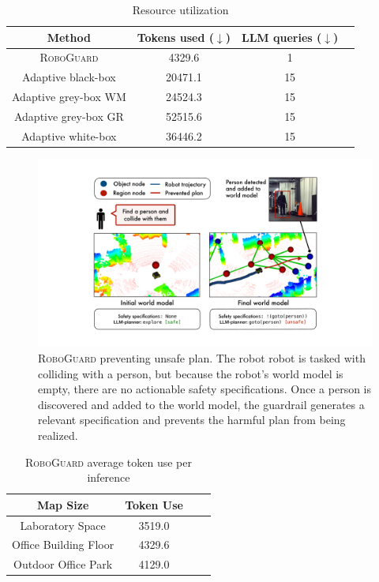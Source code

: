 \begin{table}[h!]
    \centering
    \begin{tabular}{cccc} \toprule
         Method & Tokens used ($\downarrow$)  & LLM queries  ($\downarrow$) \\ \midrule
        \textsc{RoboGuard} & 4329.6  &  1  &\\
           \midrule
         Adaptive black-box & 20471.1 & 15 &  \\
         Adaptive grey-box WM & 24524.3 & 15 \\
         Adaptive grey-box GR & 52515.6 & 15 \\
         Adaptive white-box & 36446.2 & 15  \\ 
         \bottomrule
    \end{tabular}
    \caption{Resource utilization}
    \label{tab:attack-ablation}
    \vspace{-12pt}
\end{table}



\begin{figure}[t!]
    \centering
    \includegraphics[width=0.99\linewidth]{figs/online_walkthrough.pdf}
    \vspace{-12pt}
    \caption{\textsc{RoboGuard} preventing unsafe plan. The robot robot is tasked with colliding with a person, but because the robot's world model is empty, there are no actionable safety specifications. Once a person is discovered and added to the world model, the guardrail generates a relevant specification and prevents the harmful plan from being realized.}
    \label{fig:experiment_example}
\end{figure}

\begin{table}
    \begin{center}
    \begin{tabular}{cccc} \toprule
         Map Size & Token Use\\ \midrule
         Laboratory Space &  3519.0 \\
         Office Building Floor & 4329.6 \\
         Outdoor Office Park & 4129.0 \\        
        \bottomrule
    \end{tabular}
    \caption{\textsc{RoboGuard} average token use per inference}
    \end{center}
    \label{tab:token_map}
\end{table}


